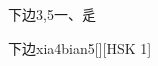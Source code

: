 \begin{entry}{下边}{3,5}{⼀、⾡}
  \begin{phonetics}{下边}{xia4bian5}[][HSK 1]
  \end{phonetics}
\end{entry}
